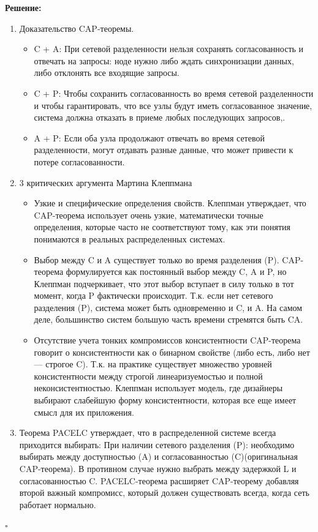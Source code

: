 \documentclass[12pt]{article}
\newenvironment{solution}
{
  \par\textbf{Решение:}\par\bigbreak
  \begingroup
}
{
  \par\bigbreak\hfill$\square$%
  \par\endgroup
}
\begin{document}
\begin{solution}
	\begin{enumerate}
    \item Доказательство CAP-теоремы.
		\begin{itemize}
			\item C + A: При сетевой разделенности нельзя сохранять согласованность и отвечать на запросы: ноде нужно либо ждать синхронизации данных, либо отклонять все входящие запросы.
			\item C + P: Чтобы сохранить согласованность во время сетевой разделенности и чтобы гарантировать, что все узлы будут иметь согласованное значение, система должна отказать в приеме любых последующих запросов,.
			\item A + P: Если оба узла продолжают отвечать во время сетевой разделенности, могут отдавать разные данные, что может привести к потере согласованности.
		\end{itemize}
    \item 3 критических аргумента Мартина Клеппмана
        \begin{itemize}
            \item Узкие и специфические определения свойств. Клеппман утверждает, что CAP-теорема использует очень узкие, математически точные определения, которые часто не соответствуют тому, как эти понятия понимаются в реальных распределенных системах.
            \item Выбор между C и A существует только во время разделения (P). CAP-теорема формулируется как постоянный выбор между C, A и P, но Клеппман подчеркивает, что этот выбор вступает в силу только в тот момент, когда P фактически происходит. Т.к. если нет сетевого разделения (P), система может быть одновременно и C, и A. На самом деле, большинство систем большую часть времени стремятся быть CA.
            \item Отсутствие учета тонких компромиссов консистентности CAP-теорема говорит о консистентности как о бинарном свойстве (либо есть, либо нет — строгое C). Т.к. на практике существует множество уровней консистентности между строгой линеаризуемостью и полной неконсистентностью. Клеппман использует модель, где дизайнеры выбирают слабейшую форму консистентности, которая все еще имеет смысл для их приложения.
        \end{itemize}
    \item Теорема PACELC утверждает, что в распределенной системе всегда приходится выбирать: При наличии сетевого разделения (P): необходимо выбирать между доступностью (A) и согласованностью (C)(оригинальная CAP-теорема). В противном случае нужно выбрать между задержкой L и согласованностью C. PACELC-теорема расширяет CAP-теорему добавляя второй важный компромисс, который должен существовать всегда, когда сеть работает нормально.
    \end{enumerate}
\end{solution}
\end{document}
